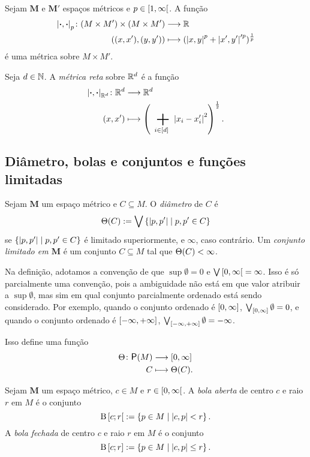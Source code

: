 \begin{exercise}[Métricas $p$]
Sejam $\bm M$ e $\bm M'$ espaços métricos e $p \in \left[{1},{\infty}\right[$.
A função
	\begin{align*}
	{\left\vert{\bm{\cdot}},{\bm{\cdot}}\right\vert_p}\colon {(M \times M') \times (M \times M')} &\longrightarrow {\mathbb{R}} \\{((x,x'),(y,y'))} &\longmapsto (\left\vert{x},{y}\right\vert^p + \left\vert{x'},{y'}\right\vert'^p)^{\frac{1}{p}}
	\end{align*}
é uma métrica sobre $M \times M'$.
\end{exercise}

\begin{definition}
Seja $d \in \mathbb{N}$. A \emph{métrica reta} sobre $\mathbb{R}^d$ é a função
	\begin{align*}
	\func{\dist{\var}{\var}_{\R^d}}{\R^d}{\R^d}{(x,x')}{\left( \sum_{i \in [d]} \abs{x_i-x'_i}^2 \right)^{\frac{1}{2}}}.
	\end{align*}
\end{definition}


\subsection{Diâmetro, bolas e conjuntos e funções limitadas}

\begin{definition}
Sejam $\bm M$ um espaço métrico e $C \subseteq M$. O \emph{diâmetro} de $C$ é
	\begin{equation*}
	\Theta(C) := \bigvee\left\{{\left\vert{p},{p'}\right\vert}\;\middle\vert\;{p,p' \in C}\right\}
	\end{equation*}
se $\left\{{\left\vert{p},{p'}\right\vert}\;\middle\vert\;{p,p' \in C}\right\}$ é limitado superiormente, e $\infty$, caso contrário. Um \emph{conjunto limitado em $\bm M$} é um conjunto $C \subseteq M$ tal que $\Theta(C) < \infty$.
\end{definition}

Na definição, adotamos a convenção de que $\sup \emptyset = 0$ e $\bigvee \left[{0},{\infty}\right[ = \infty$. Isso é só parcialmente uma convenção, pois a ambiguidade não está em que valor atribuir a $\sup \emptyset$, mas sim em qual conjunto parcialmente ordenado está sendo considerado. Por exemplo, quando o conjunto ordenado é $\left[{0},{\infty}\right]$, $\bigvee_{\left[{0},{\infty}\right]} \emptyset = 0$, e quando o conjunto ordenado é $\left[{-\infty},{+\infty}\right]$, $\bigvee_{\left[{-\infty},{+\infty}\right]} \emptyset = -\infty$.

Isso define uma função
	\begin{align*}
	\func{\diam}{\p(M)}{\intff{0}{\infty}}{C}{\diam(C)}.
	\end{align*}

\begin{definition}
Sejam $\bm M$ um espaço métrico, $c \in M$ e $r \in \left[{0},{\infty}\right[$. A \emph{bola aberta} de centro $c$ e raio $r$ em $M$ é o conjunto
	\begin{equation*}
	\mathrm{B}\left[{c};{r}\right[ := \left\{{p \in M}\;\middle\vert\;{\left\vert{c},{p}\right\vert < r}\right\}.
	\end{equation*}
A \emph{bola fechada} de centro $c$ e raio $r$ em $M$ é o conjunto
	\begin{equation*}
	\mathrm{B}\left[{c};{r}\right] := \left\{{p \in M}\;\middle\vert\;{\left\vert{c},{p}\right\vert \leq r}\right\}.
	\end{equation*}
\end{definition}

